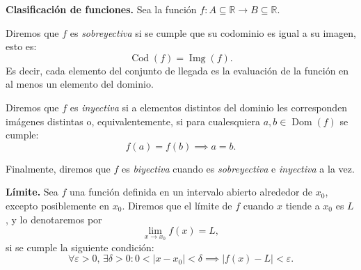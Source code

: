 \begin{definition}{\textbf{Clasificación de funciones.}}
Sea la función $f \colon A \subseteq \mathbb{R} \to B \subseteq \mathbb{R}$. 

Diremos que $f$ es \textit{sobreyectiva} si se cumple que su codominio es igual a su imagen, esto es:
\begin{equation*} 
\operatorname{Cod}(f) = \operatorname{Img}(f). 
\end{equation*} 
Es decir, cada elemento del conjunto de llegada es la evaluación de la función en al menos un elemento del dominio. 

Diremos que $f$ es \textit{inyectiva} si a elementos distintos del dominio les corresponden imágenes distintas o, equivalentemente, si para cualesquiera $a,b \in \operatorname{Dom}(f)$ se cumple:
\begin{equation*} 
f(a) = f(b) \implies a = b. 
\end{equation*} 

Finalmente, diremos que $f$ es \textit{biyectiva} cuando es \textit{sobreyectiva} e \textit{inyectiva} a la vez. 
\end{definition}

\begin{definition}\label{def:Limite}{\textbf{Límite.}}  Sea $f$ una función definida en un intervalo abierto alrededor de $x_0$, excepto posiblemente en $x_0$. Diremos que el límite de $f$ cuando $x$ tiende a $x_0$ es $L$, y lo denotaremos por 
\begin{equation*} 
\lim_{x \to x_0} f(x) = L, 
\end{equation*} 
si se cumple la siguiente condición: 
\begin{equation*} 
\forall \varepsilon > 0, \, \exists \delta > 0 \colon 0 < |x - x_0| < \delta \implies |f(x) - L| < \varepsilon. 
\end{equation*} 
\end{definition}




